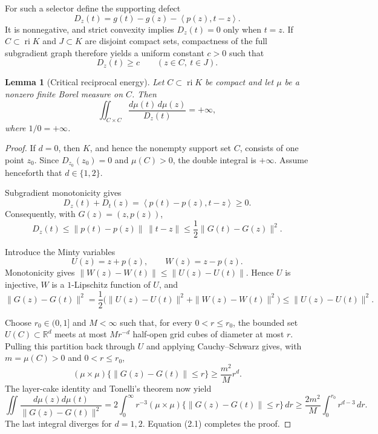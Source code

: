 \documentclass[11pt,a4paper]{amsart}
\newtheorem{lemma}[theorem]{Lemma}
\theoremstyle{remark}
\newcommand{\ri}{\operatorname{ri}}
\newcommand{\inner}[2]{\left\langle #1,#2\right\rangle}
\begin{document}
For such a selector define the supporting defect
\[
 D_z(t)=g(t)-g(z)-\inner{p(z)}{t-z}.
\]
It is nonnegative, and strict convexity implies \(D_z(t)=0\) only when
\(t=z\).  If \(C\subset\ri K\) and \(J\subset K\) are disjoint compact sets,
compactness of the full subgradient graph therefore yields a uniform
constant \(c>0\) such that
\begin{equation}\label{eq:separation}
 D_z(t)\geq c\qquad(z\in C,\ t\in J).
\end{equation}

\begin{lemma}[Critical reciprocal energy]\label{lem:energy}
Let \(C\subset\ri K\) be compact and let \(\mu\) be a nonzero finite Borel
measure on \(C\).  Then
\[
 \iint_{C\times C}\frac{d\mu(t)\,d\mu(z)}{D_z(t)}=+\infty,
\]
where \(1/0=+\infty\).
\end{lemma}

\begin{proof}
If \(d=0\), then \(K\), and hence the nonempty support set \(C\), consists
of one point \(z_0\).  Since \(D_{z_0}(z_0)=0\) and \(\mu(C)>0\), the
double integral is \(+\infty\).  Assume henceforth that
\(d\in\{1,2\}\).

Subgradient monotonicity gives
\[
 D_z(t)+D_t(z)=\inner{p(t)-p(z)}{t-z}\geq0.
\]
Consequently, with \(G(z)=(z,p(z))\),
\[
 D_z(t)\leq\|p(t)-p(z)\|\,\|t-z\|
 \leq\frac12\|G(t)-G(z)\|^2.                 \tag{2.1}
\]

Introduce the Minty variables
\[
 U(z)=z+p(z),\qquad W(z)=z-p(z).
\]
Monotonicity gives
\(\|W(z)-W(t)\|\leq\|U(z)-U(t)\|\).  Hence \(U\) is injective, \(W\) is a
\(1\)-Lipschitz function of \(U\), and
\[
 \|G(z)-G(t)\|^2
 =\frac12\bigl(\|U(z)-U(t)\|^2+\|W(z)-W(t)\|^2\bigr)
 \leq\|U(z)-U(t)\|^2.                       \tag{2.2}
\]

Choose \(r_0\in(0,1]\) and \(M<\infty\) such that, for every
\(0<r\leq r_0\), the bounded set \(U(C)\subset\mathbb R^d\) meets at most
\(Mr^{-d}\) half-open grid cubes of diameter at most \(r\).  Pulling this
partition back through \(U\) and applying Cauchy--Schwarz gives, with
\(m=\mu(C)>0\) and \(0<r\leq r_0\),
\[
 (\mu\times\mu)\{\|G(z)-G(t)\|\leq r\}
 \geq \frac{m^2}{M}r^d.                     \tag{2.3}
\]
The layer-cake identity and Tonelli's theorem now yield
\[
 \iint\frac{d\mu(z)d\mu(t)}{\|G(z)-G(t)\|^2}
 =2\int_0^\infty r^{-3}
   (\mu\times\mu)\{\|G(z)-G(t)\|\leq r\}\,dr
 \geq\frac{2m^2}{M}\int_0^{r_0}r^{d-3}\,dr.
\]
The last integral diverges for \(d=1,2\).  Equation (2.1) completes the
proof.
\end{proof}
\end{document}
